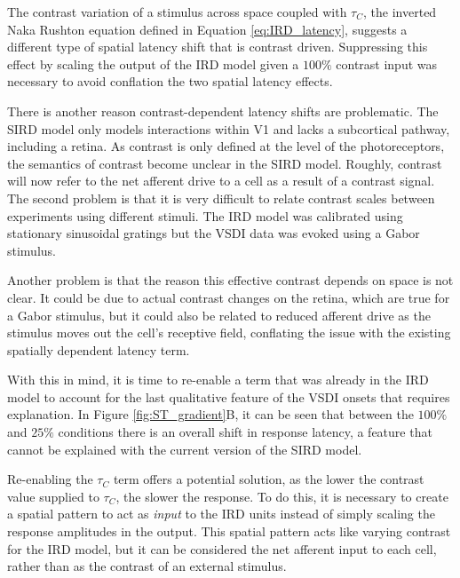 \documentclass[phd,ianc,twoside]{infthesis}
\begin{document}
The contrast variation of a stimulus across space coupled with $\tau_C$,
the inverted Naka Rushton equation defined in Equation
\ref{eq:IRD_latency}, suggests a different type of spatial latency shift
that is contrast driven. Suppressing this effect by scaling the output
of the IRD model given a $100\%$ contrast input was necessary to avoid
conflation the two spatial latency effects.

There is another reason contrast-dependent latency shifts are
problematic. The SIRD model only models interactions within V1 and lacks
a subcortical pathway, including a retina. As contrast is only defined
at the level of the photoreceptors, the semantics of contrast become
unclear in the SIRD model. Roughly, contrast will now refer to the net
afferent drive to a cell as a result of a contrast signal. The second
problem is that it is very difficult to relate contrast scales between
experiments using different stimuli. The IRD model was calibrated using
stationary sinusoidal gratings but the VSDI data was evoked using a
Gabor stimulus.

Another problem is that the reason this effective contrast depends on
space is not clear. It could be due to actual contrast changes on the
retina, which are true for a Gabor stimulus, but it could also be
related to reduced afferent drive as the
stimulus moves out the cell's receptive field, conflating the issue with
the existing spatially dependent latency term.

With this in mind, it is time to re-enable a term that was already in
the IRD model to account for the last qualitative feature of the VSDI
onsets that requires explanation. In Figure \ref{fig:ST_gradient}B, it
can be seen that between the $100\%$ and $25\%$ conditions there is an
overall shift in response latency, a feature that cannot be explained
with the current version of the SIRD model.

Re-enabling the $\tau_C$ term offers a potential solution, as the
lower the contrast value supplied to $\tau_C$, the slower the
response. To do this, it is necessary to create a spatial pattern to act
as \emph{input} to the IRD units instead of simply scaling the response
amplitudes in the output. This spatial pattern acts like varying
contrast for the IRD model, but it can be considered the net afferent
input to each cell, rather than as the contrast of an external stimulus.
\end{document}
